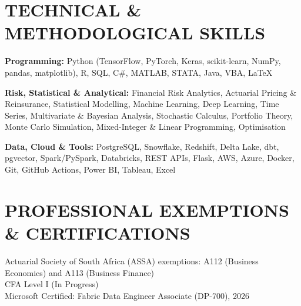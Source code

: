 \documentclass[letterpaper,11pt]{article}
\begin{document}
\section{\color{airforceblue}TECHNICAL \& METHODOLOGICAL SKILLS}
 \begin{itemize}[leftmargin=0in, label={}]
    \small{\item{
     \textbf{\normalsize{Programming:}}{ \normalsize{Python (TensorFlow, PyTorch, Keras, scikit-learn, NumPy, pandas, matplotlib), R, SQL, C\#, MATLAB, STATA, Java, VBA, LaTeX}} \\
      \vspace{1.2pt}

     \textbf{\normalsize{Risk, Statistical \& Analytical:}}{ \normalsize{Financial Risk Analytics, Actuarial Pricing \& Reinsurance, Statistical Modelling, Machine Learning, Deep Learning, Time Series, Multivariate \& Bayesian Analysis, Stochastic Calculus, Portfolio Theory, Monte Carlo Simulation, Mixed-Integer \& Linear Programming, Optimisation}} \\
      \vspace{1.2pt}

     \textbf{\normalsize{Data, Cloud \& Tools:}}{ \normalsize{PostgreSQL, Snowflake, Redshift, Delta Lake, dbt, pgvector, Spark/PySpark, Databricks, REST APIs, Flask, AWS, Azure, Docker, Git, GitHub Actions, Power BI, Tableau, Excel}}
     }}
 \end{itemize}
 \vspace{-2pt}

\section{\color{airforceblue}PROFESSIONAL EXEMPTIONS \& CERTIFICATIONS}
 \begin{itemize}[leftmargin=0in, label={}]
    \small{\item{
     \normalsize{Actuarial Society of South Africa (ASSA) exemptions: A112 (Business Economics) and A113 (Business Finance)} \\
      \vspace{1.2pt}
     \normalsize{CFA Level I (In Progress)} \\
      \vspace{1.2pt}
     \normalsize{Microsoft Certified: Fabric Data Engineer Associate (DP-700), 2026}
     }}
 \end{itemize}
 \vspace{-2pt}
\end{document}
